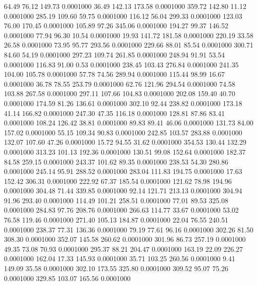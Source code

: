   64.49   76.12  149.73   0.0001000
  36.49  142.13  173.58   0.0001000
 359.72  142.80   11.12   0.0001000
 285.19  109.60   59.75   0.0001000
 116.12   56.04  299.33   0.0001000
 123.03   76.00  170.45   0.0001000
 105.89   97.26  345.06   0.0001000
 194.27   99.37  146.52   0.0001000
  77.94   96.30   10.54   0.0001000
  19.93  141.72  181.58   0.0001000
 220.19   33.58   26.58   0.0001000
  73.95   95.77  293.56   0.0001000
 229.66   88.01   85.54   0.0001000
 300.71   84.60   54.19   0.0001000
 297.23  109.74  261.85   0.0001000
 248.94   91.91   53.54   0.0001000
 116.83   91.00    0.53   0.0001000
 238.45  103.43  276.84   0.0001000
 241.35  104.00  105.78   0.0001000
  57.78   74.56  289.94   0.0001000
 115.44   98.99   16.67   0.0001000
  36.78   78.55  253.79   0.0001000
  62.76  121.96  294.54   0.0001000
  74.58  103.88  267.58   0.0001000
 297.11  107.66  104.83   0.0001000
 202.08  159.40   40.70   0.0001000
 174.59   81.26  136.61   0.0001000
 302.10   92.44  238.82   0.0001000
 173.18   41.14  166.82   0.0001000
 247.30   47.35  116.18   0.0001000
 128.81   87.86   83.41   0.0001000
 108.24  126.42   38.81   0.0001000
  89.83   89.41   46.06   0.0001000
 131.73   84.00  157.02   0.0001000
  55.15  109.34   90.83   0.0001000
 242.85  103.57  283.88   0.0001000
 132.07  107.60   47.26   0.0001000
  15.72   94.55   31.62   0.0001000
 354.53  130.44  132.29   0.0001000
 313.23  101.13  192.36   0.0001000
 130.51   99.08  152.64   0.0001000
 182.37   84.58  259.15   0.0001000
 243.37  101.62   89.35   0.0001000
 238.53   54.30  280.86   0.0001000
 245.14   95.91  288.52   0.0001000
 283.04  111.83  194.75   0.0001000
  17.63  152.42  306.31   0.0001000
 222.92   67.37  185.54   0.0001000
 121.62   78.98  194.96   0.0001000
 304.48   71.44  339.85   0.0001000
  92.14  121.71  213.13   0.0001000
 304.94   91.96  293.40   0.0001000
 114.49  101.21  258.51   0.0001000
  77.01   89.53  325.08   0.0001000
 284.83   97.76  208.76   0.0001000
 266.63  114.77   33.67   0.0001000
  53.02   76.58  119.46   0.0001000
 271.40  105.13  184.87   0.0001000
  22.04   76.55  240.51   0.0001000
 238.37   77.31  136.36   0.0001000
  79.19   77.61   96.16   0.0001000
 302.26   81.50  308.30   0.0001000
 352.07  145.58  260.62   0.0001000
 301.96   86.73  257.19   0.0001000
  49.35   73.08   70.93   0.0001000
 295.37   88.21  204.47   0.0001000
 163.19   22.09  226.27   0.0001000
 162.04   17.33  145.93   0.0001000
  35.71  103.25  260.56   0.0001000
   9.41  149.09   35.58   0.0001000
 302.10  173.55  325.80   0.0001000
 309.52   95.07   75.26   0.0001000
 329.85  103.07  165.56   0.0001000
